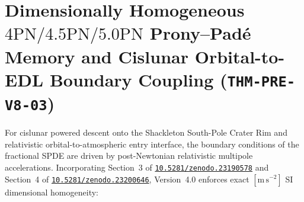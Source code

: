\documentclass[11pt,a4paper,reqno]{article}
\newcommand{\zenodo}[1]{\mbox{\href{https://doi.org/10.5281/zenodo.#1}{\texttt{10.5281/zenodo.#1}}}}
\theoremstyle{plain}
\theoremstyle{definition}
\theoremstyle{remark}
\numberwithin{equation}{section}
\begin{document}
\section{Dimensionally Homogeneous \texorpdfstring{$4\mathrm{PN}/4.5\mathrm{PN}/5.0\mathrm{PN}$}{4PN/4.5PN/5.0PN} Prony--Pad\'e Memory and Cislunar Orbital-to-EDL Boundary Coupling (\texttt{THM-PRE-V8-03})}
\label{sec:hereditary_4pn_5pn_spde_v4}

For cislunar powered descent onto the Shackleton South-Pole Crater Rim and relativistic orbital-to-atmospheric entry interface, the boundary conditions of the fractional SPDE are driven by post-Newtonian relativistic multipole accelerations. Incorporating Section~3 of \zenodo{23190578} and Section~4 of \zenodo{23200646}, Version~4.0 enforces exact $[\mathrm{m\,s^{-2}}]$ SI dimensional homogeneity:
\end{document}
